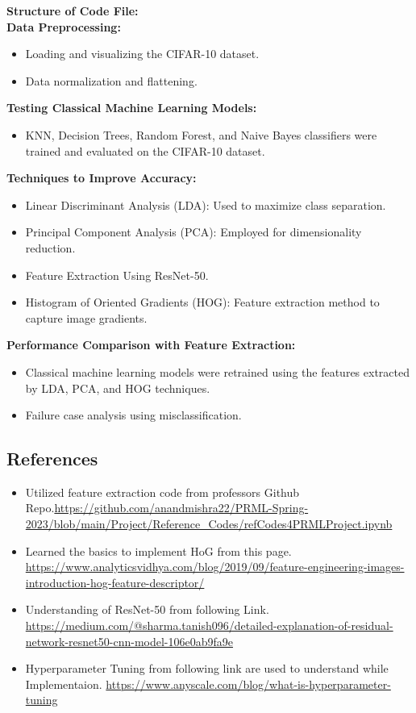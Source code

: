 \documentclass[a4paper]{article}
\theoremstyle{plain}
\theoremstyle{definition}
\begin{document}
\textbf{Structure of Code File:}\\ 

\textbf{Data Preprocessing:}
\begin{itemize}
    \item Loading and visualizing the CIFAR-10 dataset.
    \item Data normalization and flattening.
\end{itemize}

\textbf{Testing Classical Machine Learning Models:}
\begin{itemize}
    \item KNN, Decision Trees, Random Forest, and Naive Bayes classifiers were trained and evaluated on the CIFAR-10 dataset.
\end{itemize}

\textbf{Techniques to Improve Accuracy:}
\begin{itemize}
    \item Linear Discriminant Analysis (LDA): Used to maximize class separation.
    \item Principal Component Analysis (PCA): Employed for dimensionality reduction.
    \item Feature Extraction Using ResNet-50.
    \item Histogram of Oriented Gradients (HOG): Feature extraction method to capture image gradients.
\end{itemize}

\textbf{Performance Comparison with Feature Extraction:}
\begin{itemize}
    \item Classical machine learning models were retrained using the features extracted by LDA, PCA, and HOG techniques.
    \item Failure case analysis using misclassification.

\end{itemize}

 \subsection{References}
 \begin{itemize}
     \item Utilized feature extraction code from professors Github Repo.\url{https://github.com/anandmishra22/PRML-Spring-2023/blob/main/Project/Reference_Codes/refCodes4PRMLProject.ipynb}
     \item Learned the basics to implement HoG from this page. \url{https://www.analyticsvidhya.com/blog/2019/09/feature-engineering-images-introduction-hog-feature-descriptor/}
     \item Understanding of ResNet-50 from following Link. \url{https://medium.com/@sharma.tanish096/detailed-explanation-of-residual-network-resnet50-cnn-model-106e0ab9fa9e}
     \item Hyperparameter Tuning from following link are used to understand while Implementaion. \url{https://www.anyscale.com/blog/what-is-hyperparameter-tuning}
 \end{itemize}
    
\end{document}
